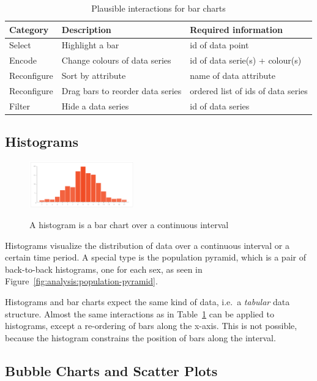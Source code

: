 \begin{table}[H]
  \centering
  \begin{tabular*}{\textwidth}{lll}
    \bf Category & \bf Description & \bf Required information \\
    \hline
    Select & Highlight a bar & id of data point \\
    Encode & Change colours of data series & id of data serie(s) + colour(s) \\
    Reconfigure & Sort by attribute & name of data attribute \\
    Reconfigure & Drag bars to reorder data series & ordered list of ids of data series \\
    Filter & Hide a data series & id of data series \\
  \end{tabular*}
  \caption{Plausible interactions for bar charts}
  \label{tab:analysis:bar-charts:interactions}
\end{table}

\subsection{Histograms}

\begin{figure}
  \centering
    \includegraphics[width=0.4\textwidth]{figures/analysis/histogram.png}%
    \label{fig:analysis:histograms}
    \caption{A histogram is a bar chart over a continuous interval}%
\end{figure}

Histograms visualize the distribution of data over a continuous interval or a certain time period.
A special type is the population pyramid, which is a pair of back-to-back histograms, one for each sex, as seen in Figure~\ref{fig:analysis:population-pyramid}.

Histograms and bar charts expect the same kind of data, i.e.\ a \emph{tabular} data structure.
Almost the same interactions as in Table~\ref{tab:analysis:bar-charts:interactions} can be applied to histograms, except a re-ordering of bars along the x-axis.
This is not possible, because the histogram constrains the position of bars along the interval.

\subsection{Bubble Charts and Scatter Plots}

